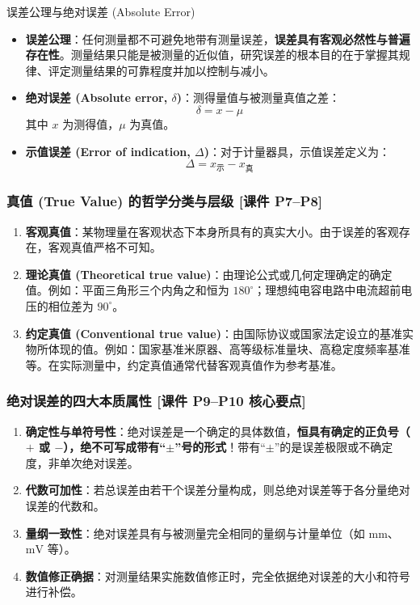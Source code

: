 \documentclass[11pt,a4paper]{ctexart}
\begin{document}
\begin{defbox}{误差公理与绝对误差 (Absolute Error)}
\begin{itemize}
    \item \textbf{误差公理}：任何测量都不可避免地带有测量误差，\textbf{误差具有客观必然性与普遍存在性}。测量结果只能是被测量的近似值，研究误差的根本目的在于掌握其规律、评定测量结果的可靠程度并加以控制与减小。
    \item \textbf{绝对误差 (Absolute error, $\delta$)}：测得量值与被测量真值之差：
    \begin{equation}
        \delta = x - \mu
    \end{equation}
    其中 $x$ 为测得值，$\mu$ 为真值。
    \item \textbf{示值误差 (Error of indication, $\Delta$)}：对于计量器具，示值误差定义为：
    \begin{equation}
        \Delta = x_{\text{示}} - x_{\text{真}}
    \end{equation}
\end{itemize}
\end{defbox}

\subsubsection{真值 (True Value) 的哲学分类与层级 \textnormal{[课件 P7--P8]}}
\begin{enumerate}
    \item \textbf{客观真值}：某物理量在客观状态下本身所具有的真实大小。由于误差的客观存在，客观真值严格不可知。
    \item \textbf{理论真值 (Theoretical true value)}：由理论公式或几何定理确定的确定值。例如：平面三角形三个内角之和恒为 $180^\circ$；理想纯电容电路中电流超前电压的相位差为 $90^\circ$。
    \item \textbf{约定真值 (Conventional true value)}：由国际协议或国家法定设立的基准实物所体现的值。例如：国家基准米原器、高等级标准量块、高稳定度频率基准等。在实际测量中，约定真值通常代替客观真值作为参考基准。
\end{enumerate}

\subsubsection{绝对误差的四大本质属性 \textnormal{[课件 P9--P10 核心要点]}}
\begin{enumerate}
    \item \textbf{确定性与单符号性}：绝对误差是一个确定的具体数值，\textbf{恒具有确定的正负号（$+$ 或 $-$），绝不可写成带有“$\pm$”号的形式}！带有“$\pm$”的是误差极限或不确定度，非单次绝对误差。
    \item \textbf{代数可加性}：若总误差由若干个误差分量构成，则总绝对误差等于各分量绝对误差的代数和。
    \item \textbf{量纲一致性}：绝对误差具有与被测量完全相同的量纲与计量单位（如 $\text{mm}$、$\text{mV}$ 等）。
    \item \textbf{数值修正确据}：对测量结果实施数值修正时，完全依据绝对误差的大小和符号进行补偿。
\end{enumerate}
\end{document}
